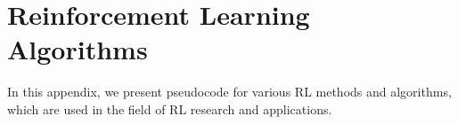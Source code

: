 \documentclass[../xlapes02]{subfiles}
\begin{document}
    \chapter{Reinforcement Learning Algorithms}
    In this appendix, we present pseudocode for various RL methods and algorithms, which are used in the field of RL research and applications.

%
%
%
%
\end{document}

